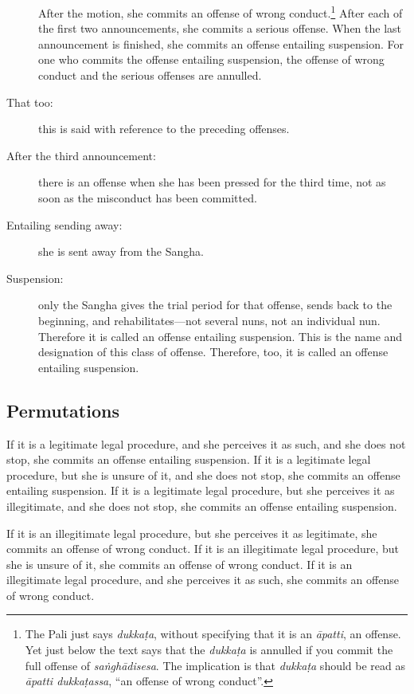 \documentclass[12pt,openany]{book}%
\begin{document}
\begin{description}
After the motion, she commits an offense of wrong conduct.\footnote{The Pali just says \textit{\textsanskrit{dukkaṭa}}, without specifying that it is an \textit{\textsanskrit{āpatti}}, an offense. Yet just below the text says that the \textit{\textsanskrit{dukkaṭa}} is annulled if you commit the full offense of \textit{\textsanskrit{saṅghādisesa}}. The implication is that \textit{\textsanskrit{dukkaṭa}} should be read as \textit{\textsanskrit{āpatti} \textsanskrit{dukkaṭassa}}, “an offense of wrong conduct”. } After each of the first two announcements, she commits a serious offense. When the last announcement is finished, she commits an offense entailing suspension. For one who commits the offense entailing suspension, the offense of wrong conduct and the serious offenses are annulled. 

%
\item[That too: ] this is said with reference to the preceding offenses. %
\item[After the third announcement: ] there is an offense when she has been pressed for the third time, not as soon as the misconduct has been committed. %
\item[Entailing sending away: ] she is sent away from the Sangha. %
\item[Suspension: ] only the Sangha gives the trial period for that offense, sends back to the beginning, and rehabilitates—not several nuns, not an individual nun. Therefore it is called an offense entailing suspension. This is the name and designation of this class of offense. Therefore, too, it is called an offense entailing suspension. %
\end{description}

\subsection*{Permutations }

If it is a legitimate legal procedure, and she perceives it as such, and she does not stop, she commits an offense entailing suspension. If it is a legitimate legal procedure, but she is unsure of it, and she does not stop, she commits an offense entailing suspension. If it is a legitimate legal procedure, but she perceives it as illegitimate, and she does not stop, she commits an offense entailing suspension. 

If it is an illegitimate legal procedure, but she perceives it as legitimate, she commits an offense of wrong conduct. If it is an illegitimate legal procedure, but she is unsure of it, she commits an offense of wrong conduct. If it is an illegitimate legal procedure, and she perceives it as such, she commits an offense of wrong conduct. 
\end{document}
